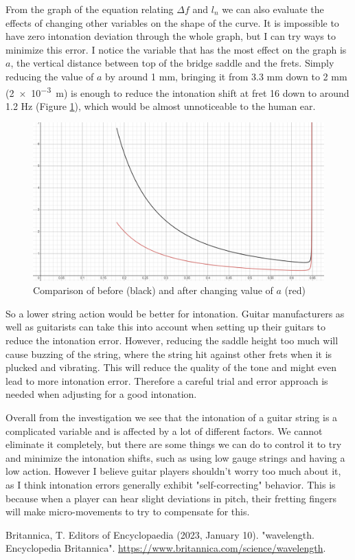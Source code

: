 \documentclass[11pt]{article}
\begin{document}
\begin{flushleft}
        From the graph of the equation relating $\Delta f$ and $l_n$ we can also evaluate the effects of changing other variables on the shape of the curve. It is impossible to have zero intonation deviation through the whole graph, but I can try ways to minimize this error. I notice the variable that has the most effect on the graph is $a$, the vertical distance between top of the bridge saddle and the frets. Simply reducing the value of $a$ by around 1 mm, bringing it from 3.3 mm down to 2 mm (\SI{2e-3}{m}) is enough to reduce the intonation shift at fret 16 down to around 1.2 Hz (Figure \ref{fig12}), which would be almost unnoticeable to the human ear. \par
        \begin{figure}[!h]
            \includegraphics[width = \textwidth]{compare_graph_a.png}
            \caption{Comparison of before (black) and after changing value of $a$ (red)} \label{fig12}
        \end{figure}
        \FloatBarrier
        So a lower string action would be better for intonation. Guitar manufacturers as well as guitarists can take this into account when setting up their guitars to reduce the intonation error. However, reducing the saddle height too much will cause buzzing of the string, where the string hit against other frets when it is plucked and vibrating. This will reduce the quality of the tone and might even lead to more intonation error. Therefore a careful trial and error approach is needed when adjusting for a good intonation. \par
        Overall from the investigation we see that the intonation of a guitar string is a complicated variable and is affected by a lot of different factors. We cannot eliminate it completely, but there are some things we can do to control it to try and minimize the intonation shifts, such as using low gauge strings and having a low action. However I believe guitar players shouldn't worry too much about it, as I think intonation errors generally exhibit "self-correcting" behavior. This is because when a player can hear slight deviations in pitch, their fretting fingers will make micro-movements to try to compensate for this.
        \begin{thebibliography}{15}
            \scriptsize
             Britannica, T. Editors of Encyclopaedia (2023, January 10). "wavelength. Encyclopedia Britannica". \url{https://www.britannica.com/science/wavelength}.
            

\end{thebibliography}
\end{flushleft}
\end{document}
